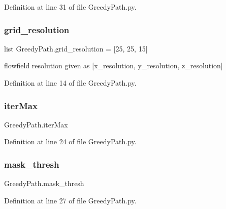 Definition at line 31 of file Greedy\+Path.\+py.

\mbox{\label{namespace_greedy_path_a1d2a41e131ea92ec827544055660645d}} 
\subsubsection{\texorpdfstring{grid\+\_\+resolution}{grid\_resolution}}
{\footnotesize\ttfamily list Greedy\+Path.\+grid\+\_\+resolution = \mbox{[}25, 25, 15\mbox{]}}



flowfield resolution given as \mbox{[}x\+\_\+resolution, y\+\_\+resolution, z\+\_\+resolution\mbox{]} 



Definition at line 14 of file Greedy\+Path.\+py.

\mbox{\label{namespace_greedy_path_a5b46b8310be6f398493f6f89ea93c90f}} 
\subsubsection{\texorpdfstring{iter\+Max}{iterMax}}
{\footnotesize\ttfamily Greedy\+Path.\+iter\+Max}



Definition at line 24 of file Greedy\+Path.\+py.

\mbox{\label{namespace_greedy_path_af051f6869eb924b58f0d44acbe2cd0a4}} 
\subsubsection{\texorpdfstring{mask\+\_\+thresh}{mask\_thresh}}
{\footnotesize\ttfamily Greedy\+Path.\+mask\+\_\+thresh}



Definition at line 27 of file Greedy\+Path.\+py.

\mbox{\label{namespace_greedy_path_a48d2bf39a0cc9f5e87640f060e67bd1c}} 
